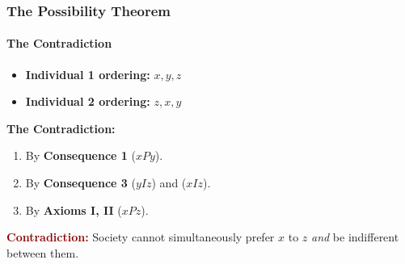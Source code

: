 \documentclass{beamer}
\begin{document}
\begin{frame}
    \frametitle{The Possibility Theorem}
    \framesubtitle{The Contradiction}
    
    \begin{itemize}
        \item \textbf{Individual 1 ordering:} $x, y, z$
        \item \textbf{Individual 2 ordering:} $z, x, y$
    \end{itemize}
    
    \vspace{0.25 cm}
    \textbf{The Contradiction:}
    \begin{enumerate}
        \item By \textbf{Consequence 1} ($xPy$).
        \item By \textbf{Consequence 3} ($yIz$) and ($xIz$).
        \item By \textbf{Axioms I, II} ($xPz$).
    \end{enumerate}
    
    \vspace{0.25cm}
    \begin{center}
        \textcolor{darkred}{\textbf{Contradiction:}} Society cannot simultaneously prefer $x$ to $z$ \textit{and} be indifferent between them.
    \end{center}

\end{frame}
\end{document}
